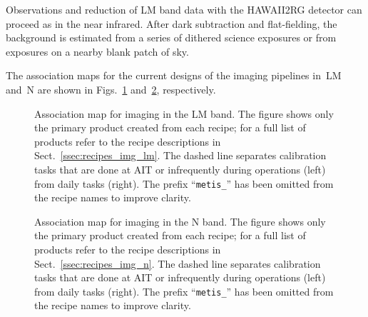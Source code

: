 Observations and reduction of LM band data with the HAWAII2RG detector
can proceed as in the near infrared. After dark subtraction and
flat-fielding, the background is estimated from a series of dithered
science exposures or from exposures on a nearby blank patch of sky.

The association maps for the current designs of the imaging pipelines
in~LM and~N are shown in Figs.~\ref{fig:IMG_LM_Assomap}
and~\ref{fig:IMG_N_Assomap}, respectively.


\begin{landscape}
  \begin{figure}
    \centering
    \resizebox{\linewidth}{!}{}
    \caption[Reduction cascade and association map for imaging in L and
      M]{Association map for imaging in the LM band. The figure shows only
      the primary product created from each recipe; for a full list of
      products refer to the recipe descriptions in
      Sect.~\ref{ssec:recipes_img_lm}. The dashed line separates
      calibration tasks that are done at AIT or infrequently during
      operations (left) from daily tasks (right). The prefix ``\texttt{metis\_}'' has been
      omitted from the recipe names to improve clarity.}
    \label{fig:IMG_LM_Assomap}
  \end{figure}
\end{landscape}

\begin{landscape}
\begin{figure}
  \centering
    \resizebox{\linewidth}{!}{}
    \caption[Reduction cascade and association map for imaging in N]{%
      Association map for imaging in the N band. The figure shows
      only the primary product created from each recipe; for a full
      list of products refer to the recipe descriptions in
      Sect.~\ref{ssec:recipes_img_n}. The dashed line separates
      calibration tasks that are done at AIT or infrequently during
      operations (left) from daily tasks (right). The prefix ``\texttt{metis\_}'' has
      been omitted from the recipe names to improve clarity.}
    \label{fig:IMG_N_Assomap}
  \end{figure}
\end{landscape}

